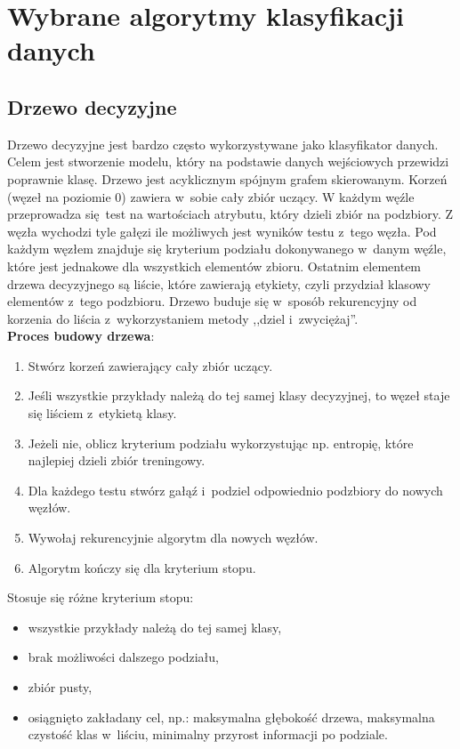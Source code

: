 \section{Wybrane algorytmy klasyfikacji danych}
\subsection{Drzewo decyzyjne}
Drzewo decyzyjne jest bardzo często wykorzystywane jako klasyfikator danych. Celem jest stworzenie modelu, który na podstawie danych wejściowych przewidzi poprawnie klasę. Drzewo jest acyklicznym spójnym grafem skierowanym. Korzeń (węzeł na poziomie 0) zawiera w~sobie cały zbiór uczący. W każdym węźle przeprowadza się test na wartościach atrybutu, który dzieli zbiór na podzbiory. Z węzła wychodzi tyle gałęzi ile możliwych jest wyników testu z~tego węzła. Pod każdym węzłem znajduje się kryterium podziału dokonywanego w~danym węźle, które jest jednakowe dla wszystkich elementów zbioru. Ostatnim elementem drzewa decyzyjnego są liście, które zawierają etykiety, czyli przydział klasowy elementów z~tego podzbioru. Drzewo buduje się w~sposób rekurencyjny od korzenia do liścia z~wykorzystaniem metody ,,dziel i~zwyciężaj''.\\
\textbf{Proces budowy drzewa}:
\begin{enumerate}
	\item Stwórz korzeń zawierający cały zbiór uczący.
	\item Jeśli wszystkie przykłady należą do tej samej klasy decyzyjnej, to węzeł staje się liściem z~etykietą klasy.
	\item Jeżeli nie, oblicz kryterium podziału wykorzystując np. entropię, które najlepiej dzieli zbiór treningowy.
	\item Dla każdego testu stwórz gałąź i~podziel odpowiednio podzbiory do nowych węzłów.
	\item Wywołaj rekurencyjnie algorytm dla nowych węzłów.
	\item Algorytm kończy się dla kryterium stopu.
\end{enumerate}
\newpage
Stosuje się różne kryterium stopu:
\begin{itemize}
	\item wszystkie przykłady należą do tej samej klasy,
	\item brak możliwości dalszego podziału,
	\item zbiór pusty,
	\item osiągnięto zakładany cel, np.: maksymalna głębokość drzewa, maksymalna czystość klas w~liściu, minimalny przyrost informacji po podziale.
\end{itemize}
